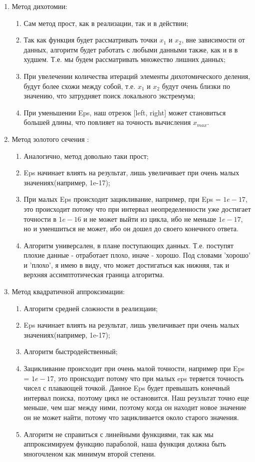\documentclass[10pt]{article}
\begin{document}
\begin{enumerate}
\item Метод дихотомии:
\begin{enumerate}
\item Сам метод прост, как в реализации, так и в действии;  
\item Так как функция будет рассматривать точки $x_1$ и $x_2$, вне зависимости от данных, алгоритм будет работать с любыми данными также, как и в в худшем. Т.е. мы будем рассматривать множество лишних данных;  
\item При увелечении количества итераций элементы дихотомического деления, будут более схожи между собой, т.е. $x_1$ и $x_2$ будут очень близки по значению, что затрудняет поиск локального экстремума; 
\item При уменьшении Eps, наш отрезок [left, right] может становиться большей длины, что повлияет на точность вычисления $x_{max}$.  
\end{enumerate}
\item Метод золотого сечения :
\begin{enumerate}
\item Аналогично, метод довольно таки прост;  
\item Eps начинает влиять на результат, лишь увеличивает при очень малых значениях(например, 1e-17);
\item При малых Eps происходит зацикливание, например, при Eps = $1e-17$, это происходит потому что при интервал неопределенности уже достигает точности в $1e-16$ и не может выйти из цикла, ибо не меньше $1e-17$, но и уменшиться не может, ибо он дошел до своего конечного ответа.
\item Алгоритм универсален, в плане поступающих данных. Т.е. поступят плохие данные - отработает плохо, иначе  - хорошо. Под словами 'хорошо' и 'плохо', я имею в виду, что может достигаться как нижняя, так и верхняя ассимптотическая граница алгоритма.
\end{enumerate}
\item Метод квадратичной аппроксимации:
\begin{enumerate}
\item Алгоритм средней сложности в реализцаии;  
\item Eps начинает влиять на результат, лишь увеличивает при очень малых значениях(например, 1e-17);
\item Алгоритм быстродейственный;
\item Зацикливание происходит при очень малой точности, например при Eps = $1e-17$, это происходит потому что при малых eps теряется точность чисел с плавающей точкой. Данное Eps будет превышать конечный интервал поиска, поэтому цикл не остановится. Hаш реузльтат точно еще меньше, чем шаг между ними, поэтому когда он находит новое значение он не может найти, потому что зацикливается около старого значения.
\item Алгоритм не справиться с линейными функциями, так как мы аппроксимируем функцию параболой, наша функция должна быть многочленом как минимум второй степени.
\end{enumerate}
\end{enumerate}
\end{document}
